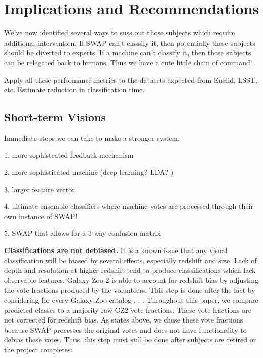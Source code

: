 \documentclass[twocolumn]{aastex6}
\begin{document}
\section{Implications and Recommendations}\label{sec: visions}

We've now identified several ways to suss out those subjects which require
additional intervention. If SWAP can't classify it, then potentially these subjects 
should be diverted to experts. If a machine can't classify it, then those subjects
can be relegated back to humans. Thus we have a cute little chain of command!

Apply all these performance metrics to the datasets expected from Euclid, LSST, etc. 
Estimate reduction in classification time. 

\subsection{Short-term Visions}

Immediate steps we can take to make a stronger system.

1. more sophistcated feedback mechanism

2. more sophisticated machine (deep learning? LDA? )

3. larger feature vector

4. ultimate ensemble classifiers where machine votes are processed through their own instance of SWAP!

5. SWAP that allows for a 3-way confusion matrix


\textbf{Classifications are not debiased.}  
It is a known issue that any visual 
classification will be biased by several effects, especially redshift and size. 
Lack of depth and resolution at higher redshift tend to produce classifications 
which lack observable features. Galaxy Zoo 2 is able to account for redshift bias
by adjusting the vote fractions produced by the volunteers. This step is done after
the fact by considering for every Galaxy Zoo catalog
 \cite{Willett2013}, \cite{Willett2016}, \cite{Simmons2016}. 
Throughout this paper, we compare predicted classes to a majority raw GZ2 vote fractions.
These vote fractions are not corrected for redshift bias. As states above, we chose
these vote fractions because SWAP processes the original votes and does not 
have functionality to debias these votes. Thus, this step must still be done 
after subjects are retired or the project completes. 
\end{document}
